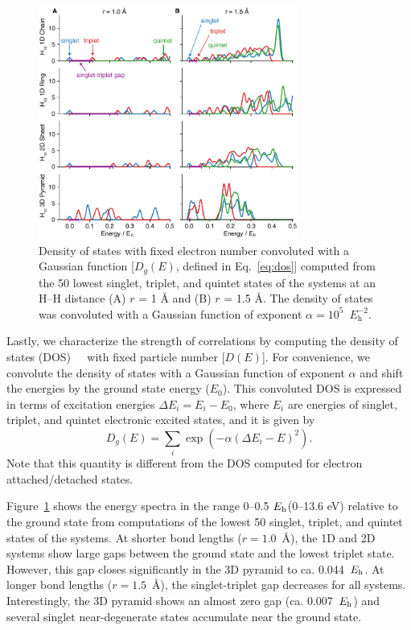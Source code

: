 \documentclass[aip,jcp,amsmath,amssymb, preprint]{revtex4-1}
\newcommand*{\Eh}{$E_{\rm h}$\xspace}
\newcommand{\add}[1]{\colorbox{goodgreen}{\textcolor{white}{\footnotesize  \fontfamily{phv}\selectfont +}}
    \textcolor{goodgreen}{{#1}}\xspace}
\begin{document}
\begin{figure}[bth]
\centering
\includegraphics[width=3.35in]{figure_2.pdf}
\caption{\textcolor{goodgreen}{Density of states with fixed electron number convoluted with a  Gaussian function [$D_g(E)$, defined in Eq.~\eqref{eq:dos}] computed from the 50 lowest singlet, triplet, and quintet states of the  systems at an H--H distance (A) $r$ = 1 {\AA} and (B) $r$ = 1.5 {\AA}.
The density of states was convoluted with a Gaussian function of exponent $\alpha=10^5$~$E_\mathrm{h}^{-2}$.
}
}
\label{fig:spectra}
\end{figure} 

Lastly, we characterize the strength of correlations by computing the density of states (DOS) \add{with fixed particle number [$D(E)$].
For convenience, we convolute the density of states with a Gaussian function of exponent $\alpha$ and shift the energies by the ground state energy ($E_0$).
This convoluted DOS is expressed in terms of excitation energies  $\Delta E_i = E_i- E_0 $, where $E_i$ are energies of singlet, triplet, and quintet electronic excited states, and it is given by
\begin{equation}
\label{eq:dos}
D_g(E) = \sum_i \exp(-\alpha (\Delta E_i - E)^2).
\end{equation}
Note that this quantity is different from the DOS computed for electron attached/detached states.
}

Figure~\ref{fig:spectra} shows the energy spectra in the range 0--0.5 \Eh (0--13.6 eV) relative to the ground state from computations of the lowest 50 singlet, triplet, and quintet states of the  systems. At shorter bond lengths ($r = 1.0$~{\AA}), the 1D and 2D systems show large gaps between the ground state and the lowest triplet state.
However, this gap closes significantly in the 3D pyramid to ca.  0.044~\Eh.
At longer bond lengths ($r = 1.5$~{\AA}), the singlet-triplet gap decreases for all systems. Interestingly, the 3D pyramid shows an almost zero gap (ca. 0.007~\Eh) and several singlet near-degenerate states accumulate near the ground state.
\end{document}
